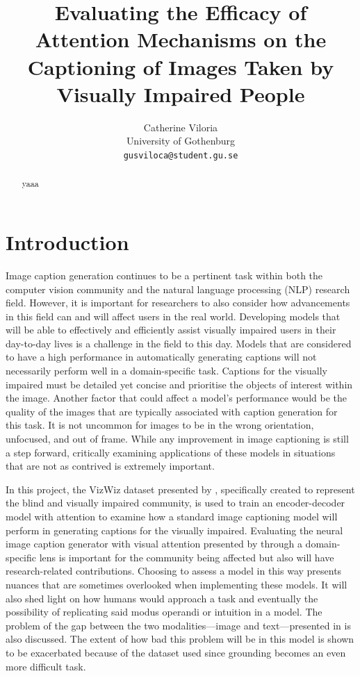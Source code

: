 \documentclass[11pt,a4paper]{article}
\title{Evaluating the Efficacy of Attention Mechanisms on the Captioning of Images Taken by Visually Impaired People}
\author{Catherine Viloria \\
  University of Gothenburg \\ 
  \texttt{gusviloca@student.gu.se}}
\date{}
\begin{document}
\maketitle
\begin{abstract}
yaaa
\end{abstract}

\section{Introduction}

Image caption generation continues to be a pertinent task within both the computer vision community and the natural language processing (NLP) research field. However, it is important for researchers to also consider how advancements in this field can and will affect users in the real world. Developing models that will be able to effectively and efficiently assist visually impaired users in their day-to-day lives is a challenge in the field to this day. Models that are considered to have a high performance in automatically generating captions will not necessarily perform well in a domain-specific task. Captions for the visually impaired must be detailed yet concise and prioritise the objects of interest within the image. Another factor that could affect a model’s performance would be the quality of the images that are typically associated with caption generation for this task. It is not uncommon for images to be in the wrong orientation, unfocused, and out of frame. While any improvement in image captioning is still a step forward, critically examining applications of these models in situations that are not as contrived is extremely important. 

In this project, the VizWiz dataset presented by \citet{Gurari-2020-captioning}, specifically created to represent the blind and visually impaired community, is used to train an encoder-decoder model with attention to examine how a standard image captioning model will perform in generating captions for the visually impaired. Evaluating the neural image caption generator with visual attention presented by \citet{Xu-2015-show-attend} through a domain-specific lens is important for the community being affected but also will have research-related contributions. Choosing to assess a model in this way presents nuances that are sometimes overlooked when implementing these models. It will also shed light on how humans would approach a task and eventually the possibility of replicating said modus operandi or intuition in a model. The problem of the gap between the two modalities—image and text—presented in \citet{Bernardi-2016-automatic} is also discussed. The extent of how bad this problem will be in this model is shown to be exacerbated because of the dataset used since grounding becomes an even more difficult task. 
\end{document}
